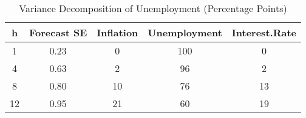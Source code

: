 \begin{table}[ht]
\centering
\caption{Variance Decomposition of Unemployment (Percentage Points)} 
\label{tab:VD-2}
\begin{tabular}{|c|c|ccc|}
  \hline
h & Forecast SE & Inflation & Unemployment & Interest.Rate \\ 
  \hline
1 & 0.23 & 0 & 100 & 0 \\ 
  4 & 0.63 & 2 & 96 & 2 \\ 
  8 & 0.80 & 10 & 76 & 13 \\ 
  12 & 0.95 & 21 & 60 & 19 \\ 
   \hline
\end{tabular}
\end{table}
